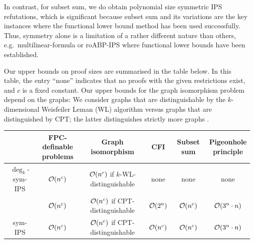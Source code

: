 \documentclass[10pt,a4paper]{article}
\newcommand{\Oo}{{\cal O}}
\newcommand{\symIPSlin}{\text{ \upshape sym-IPS}_{\mathsf{LIN}}}
\begin{document}
	In contrast, for subset sum, we do obtain polynomial size symmetric IPS refutations, which is significant because subset sum and its variations are the key instances where the functional lower bound method \cite{lowerbounds_IPS, govindasamy2022simple, hakoniemi2024functional} has been used successfully. Thus, symmetry alone is a limitation of a rather different nature than others, e.g.\ multilinear-formula or roABP-IPS where functional lower bounds have been established. 
	
	Our upper bounds on proof sizes are summarised in the table below. In this table, the entry ``none'' indicates that no proofs with the given restrictions exist, and $c$ is a fixed constant. Our upper bounds for the graph isomorphism problem depend on the graphs: 
	We consider graphs that are distinguishable by the $k$-dimensional Weisfeiler Leman (WL) algorithm versus graphs that are distinguished by CPT; the latter distinguishes strictly more graphs \cite{dawar2008}.
	\begin{table}[h]
		\centering
		\begin{tabular}{c|c|c|c|c|c}
			&\makecell{\textbf{FPC-definable}\\ \textbf{problems}} &\makecell{\textbf{Graph}\\ \textbf{isomorphism}} & \textbf{CFI} & \textbf{Subset sum} & \makecell{\textbf{Pigeonhole}\\ \textbf{principle}}\\
			\hline
			$\deg_k$-sym-IPS & $\Oo(n^c)$ & \makecell{$\Oo(n^c)$ if $k$-WL-\\ distinguishable} & none & none & none\\
			\hline
			\makecell{$\symIPSlin$} & $\Oo(n^c)$ & \makecell{$\Oo(n^c)$ if CPT-\\ distinguishable}& $\Oo(2^n)$ & $\Oo(n^c)$ & $\Oo(3^n \cdot n)$ \\
			\hline
			sym-IPS & $\Oo(n^c)$ & \makecell{$\Oo(n^c)$ if CPT-\\ distinguishable} & $\Oo(n^c)$ & $\Oo(n^c)$ & $\Oo(3^n \cdot n)$
		\end{tabular}
	\end{table}	
\end{document}
